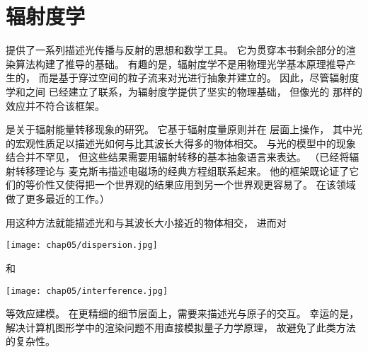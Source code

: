 \section{辐射度学}\label{sec:辐射度学}
 
提供了一系列描述光传播与反射的思想和数学工具。
它为贯穿本书剩余部分的渲染算法构建了推导的基础。
有趣的是，辐射度学不是用物理光学基本原理推导产生的，
而是基于穿过空间的粒子流来对光进行抽象并建立的。
因此，尽管辐射度学和之间
已经建立了联系，为辐射度学提供了坚实的物理基础，
但像光的
那样的效应并不符合该框架。

是关于辐射能量转移现象的研究。
它基于辐射度量原则并在
层面上操作，
其中光的宏观性质足以描述光如何与比其波长大得多的物体相交。
与光的模型中的现象结合并不罕见，
但这些结果需要用辐射转移的基本抽象语言来表达。
（\citet{PREISENDORFER19653}已经将辐射转移理论与
麦克斯韦描述电磁场的经典方程组联系起来。
他的框架既论证了它们的等价性又使得把一个世界观的结果应用到另一个世界观更容易了。
\citet{Fante:81}在该领域做了更多最近的工作。）

用这种方法就能描述光和与其波长大小接近的物体相交，
进而对
\begin{marginfigure}
    \texttt{[image: chap05/dispersion.jpg]}
\end{marginfigure}
和
\begin{marginfigure}
    \texttt{[image: chap05/interference.jpg]}
\end{marginfigure}
等效应建模。
在更精细的细节层面上，需要来描述光与原子的交互。
幸运的是，解决计算机图形学中的渲染问题不用直接模拟量子力学原理，
故避免了此类方法的复杂性。

